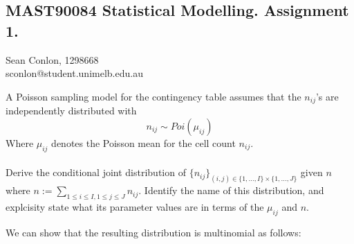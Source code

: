 \documentclass[nocolor]{report}
\begin{document}
    \newpage
    \subsection*{\hspace{25mm} MAST90084 Statistical Modelling. Assignment 1.}
\begin{center}
    Sean Conlon, 1298668 \\
    sconlon@student.unimelb.edu.au
\end{center}


\begin{ex}[Question 1a] A Poisson sampling model for the contingency table assumes that the $n_{ij}$’s are independently distributed with
$$n_{ij}\sim Poi(\mu_{ij})$$
Where $\mu_{ij}$ denotes the Poisson mean for the cell count $n_{ij}$. \\
\\
Derive the conditional joint distribution of $\{n_{ij}\}_{(i,j)\in\{1,\dots,I\}\times\{1,\dots,J\}}$ given $n$ where $n:=\sum_{1\leq i\leq I, 1\leq j\leq J}n_{ij}$. Identify the name of this distribution, and explcisity state what its parameter values are in terms of the $\mu_{ij}$ and $n$.
\end{ex}
\vspace{-10pt}
\begin{soln}
    We can show that the resulting distribution is multinomial as follows:
\end{soln}
\end{document}
